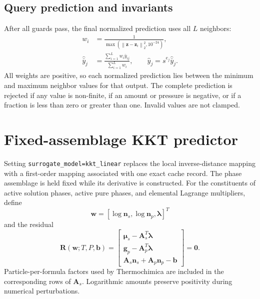 \documentclass[11pt]{article}
\newcommand{\norm}[1]{\left\lVert #1\right\rVert_2}
\newcommand{\code}[1]{\texttt{#1}}
\begin{document}
\subsection{Query prediction and invariants}

After all guards pass, the final normalized prediction uses all $L$ neighbors:
\begin{align}
  w_i&=\frac{1}{\max\!\left(
  \norm{\boldsymbol{z}-\boldsymbol{z}_i}^{2},10^{-24}\right)},\\
  \widehat{\bar y}_j
  &=\frac{\displaystyle\sum_{i=1}^{L}w_i\bar y_{ij}}
  {\displaystyle\sum_{i=1}^{L}w_i},
  \qquad
  \widehat y_j=s^{e_j}\widehat{\bar y}_j.
  \label{eq:query-prediction}
\end{align}
All weights are positive, so each normalized prediction lies between the minimum and maximum
neighbor values for that output.  The complete prediction is rejected if any value is non-finite,
if an amount or pressure is negative, or if a fraction is less than zero or greater than one.
Invalid values are not clamped.

\section{Fixed-assemblage KKT predictor}

Setting \code{surrogate\_model=kkt\_linear} replaces the local inverse-distance mapping with a
first-order mapping associated with one exact cache record.  The phase assemblage is held fixed
while its derivative is constructed.  For the constituents of active solution phases, active
pure phases, and elemental Lagrange multipliers, define
\begin{equation}
  \boldsymbol{w}
  =\left[\log\boldsymbol{n}_s,\log\boldsymbol{n}_p,\boldsymbol{\lambda}\right]^T
\end{equation}
and the residual
\begin{equation}
  \boldsymbol{R}(\boldsymbol{w};T,P,\boldsymbol{b})=
  \begin{bmatrix}
    \boldsymbol{\mu}_s-\mathbf{A}_s^T\boldsymbol{\lambda}\\
    \boldsymbol{g}_p-\mathbf{A}_p^T\boldsymbol{\lambda}\\
    \mathbf{A}_s\boldsymbol{n}_s+\mathbf{A}_p\boldsymbol{n}_p-\boldsymbol{b}
  \end{bmatrix}=\boldsymbol{0}.
  \label{eq:kkt-residual}
\end{equation}
Particle-per-formula factors used by Thermochimica are included in the corresponding rows of
$\mathbf{A}_s$.  Logarithmic amounts preserve positivity during numerical perturbations.
\end{document}
